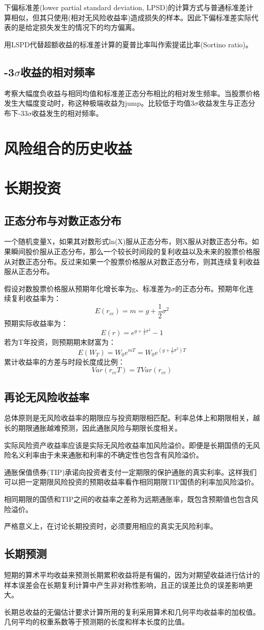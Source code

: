\documentclass{article}
\begin{document}
下偏标准差(lower partial standard deviation, LPSD)的计算方式与普通标准差计算相似，但其只使用(相对无风险收益率)造成损失的样本。因此下偏标准差实际代表的是给定损失发生的情况下的均方偏离。

用LSPD代替超额收益的标准差计算的夏普比率叫作索提诺比率(Sortino ratio)。

\subsection{-3$ \sigma $收益的相对频率}
考察大幅度负收益与相同均值和标准差正态分布相比的相对发生频率。当股票价格发生大幅度变动时，称这种极端收益为jump。比较低于均值3$ \sigma $收益发生与正态分布下-33$ \sigma $收益发生的相对频率。

\section{风险组合的历史收益}

\section{长期投资}
\subsection{正态分布与对数正态分布}
一个随机变量X，如果其对数形式ln(X)服从正态分布，则X服从对数正态分布。如果瞬间股价服从正态分布，那么一个较长时间段的复利收益以及未来的股票价格服从对数正态分布。反过来如果一个股票价格服从对数正态分布，则其连续复利收益服从正态分布。

假设对数股票价格服从预期年化增长率为g、标准差为$ \sigma $的正态分布。预期年化连续复利收益率为：
\[
E(r_{cc})=m=g+\frac{1}{2}\sigma^2
\]
预期实际收益率为：
\[
E(r)=e^{g+\frac{1}{2}\sigma^2}-1
\]
若为T年投资，则预期期末财富为：
\[
E(W_T)=W_0e^{mT}=W_0e^{(g+\frac{1}{2}\sigma^2)T}
\]
累计收益率的方差与时段长度成比例：
\[
Var(r_{cc}T)=TVar(r_{cc})
\]

\subsection{再论无风险收益率}
总体原则是无风险收益率的期限应与投资期限相匹配。利率总体上和期限相关，越长的期限通胀越难预测，因此通胀风险与期限长度相关。

实际风险资产收益率应该是实际无风险收益率加风险溢价。即便是长期国债的无风险名义利率由于未来通胀和利率的不确定性也包含有风险溢价。

通胀保值债券(TIP)承诺向投资者支付一定期限的保护通胀的真实利率。这样我们可以把一定期限风险投资的预期收益率看作相同期限TIP国债的利率加风险溢价。

相同期限的国债和TIP之间的收益率之差称为远期通胀率，既包含预期值也包含风险溢价。

严格意义上，在讨论长期投资时，必须要用相应的真实无风险利率。

\subsection{长期预测}
短期的算术平均收益来预测长期累积收益将是有偏的，因为对期望收益进行估计的样本误差会在长期复利计算中产生非对称性影响，且正的误差比负的误差影响更大。

长期总收益的无偏估计要求计算所用的复利采用算术和几何平均收益率的加权值。几何平均的权重系数等于预测期的长度和样本长度的比值。
\end{document}
